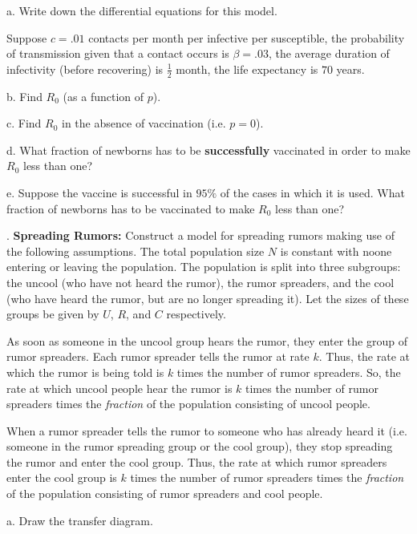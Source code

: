 \documentclass[reqno,12pt]{amsart}
\begin{document}
\bigskip
\noindent
a.  Write down the differential equations for this model.

\bigskip
Suppose $c=.01$ contacts per month per infective per susceptible,
the probability of transmission given that a contact occurs is
$\beta = .03$, the average duration of infectivity (before recovering)
is $\frac 12$ month, the life expectancy is $70$ years.
\bigskip

\noindent
b.  Find $R_0$ (as a function of $p$).

\bigskip
\noindent
c.  Find $R_0$ in the absence of vaccination (i.e. $p=0$).

\bigskip
\noindent
d.  What fraction of newborns has to be {\bf successfully}
vaccinated in order to make $R_0$ less than one?

\bigskip
\noindent
e.  Suppose the vaccine is successful in $95 \%$ of the cases in which
it is used.  What fraction of newborns has to be vaccinated to make
$R_0$ less than one?




\newpage
{}.  {\bf Spreading Rumors:}  Construct a model for spreading rumors making
use of the following assumptions.  The total population size $N$ is
constant with noone entering or leaving the population.  The population
is split into three subgroups: the uncool (who have not heard the rumor),
the rumor spreaders, and the cool (who have heard the rumor, but are no
longer spreading it).  Let the sizes of these groups be given by $U$,
$R$, and $C$ respectively.

As soon as someone in the uncool group hears the rumor, they enter the
group of rumor spreaders.  Each rumor spreader tells the rumor at rate
$k$.  Thus, the rate at which the rumor is being told is $k$ times the
number of rumor spreaders.  So, the rate at which uncool people hear the
rumor is $k$ times the number of rumor spreaders times the {\it fraction}
of the population consisting of uncool people.

When a rumor spreader tells the rumor to someone who has already heard
it (i.e. someone in the rumor spreading group or the cool group), they
stop spreading the rumor and enter the cool group.  Thus, the rate at
which rumor spreaders enter the cool group is $k$ times the number of
rumor spreaders times the {\it fraction} of the population consisting
of rumor spreaders and cool people.

\vspace{1cm}

\noindent
a.  Draw the transfer diagram.
\end{document}
